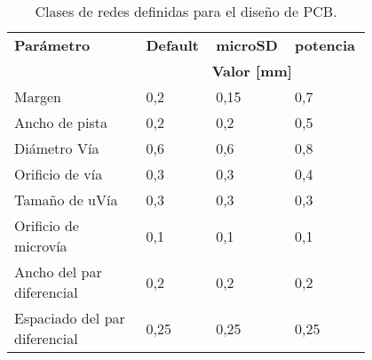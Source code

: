 \begin{table}[!hbp]
	\centering
	\small
	\caption{Clases de redes definidas para el diseño de PCB.}
	\label{tab:clases_redes}
	\begin{tabular}{p{0.35\linewidth}*{3}{p{0.15\linewidth}}}
		\toprule	
		\textbf{Parámetro} & \textbf{Default} & \textbf{microSD} & \textbf{potencia} \\
			\cmidrule{2-4}
		 & \multicolumn{3}{c}{\textbf{Valor [\si{\milli\meter}]}} \\
		\midrule
		Margen & 0,2 & 0,15 & 0,7 \\
		Ancho de pista & 0,2 & 0,2 & 0,5 \\
		Diámetro Vía & 0,6 & 0,6 & 0,8 \\
		Orificio de vía & 0,3 & 0,3 & 0,4 \\
		Tamaño de uVía & 0,3 & 0,3 & 0,3 \\
		Orificio de microvía & 0,1 & 0,1 & 0,1 \\
		Ancho del par diferencial & 0,2 & 0,2 & 0,2 \\
		Espaciado del par diferencial & 0,25 & 0,25 & 0,25 \\
		\bottomrule
	\end{tabular}
\end{table}







